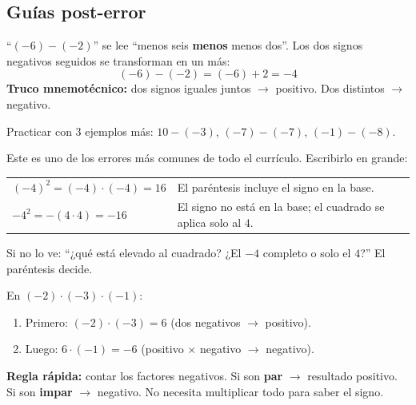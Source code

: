 \documentclass[11pt,a4paper]{article}
\begin{document}
\subsection{Guías post-error}

\begin{tcolorbox}[guia-tutor, title={\color{tutormorado} RESTAR UN NEGATIVO}]
``$(-6) - (-2)$'' se lee ``menos seis \textbf{menos} menos dos''. Los dos signos negativos seguidos se transforman en un más:
\[
  (-6) - (-2) = (-6) + 2 = -4
\]
\textbf{Truco mnemotécnico:} dos signos iguales juntos $\to$ positivo. Dos distintos $\to$ negativo.

Practicar con 3 ejemplos más: $10 - (-3)$, $(-7) - (-7)$, $(-1) - (-8)$.
\end{tcolorbox}

\begin{tcolorbox}[guia-tutor, title={\color{tutormorado} DIFERENCIA ENTRE $(-4)^{2}$ y $-4^{2}$}]
Este es uno de los errores más comunes de todo el currículo. Escribirlo en grande:

\begin{center}
\renewcommand{\arraystretch}{1.5}
\begin{tabular}{@{}ll@{}}
$(-4)^{2} = (-4)\cdot(-4) = 16$ & El paréntesis incluye el signo en la base. \\
$-4^{2} = -(4 \cdot 4) = -16$ & El signo no está en la base; el cuadrado se aplica solo al $4$. \\
\end{tabular}
\end{center}

Si no lo ve: ``¿qué está elevado al cuadrado? ¿El $-4$ completo o solo el $4$?'' El paréntesis decide.
\end{tcolorbox}

\begin{tcolorbox}[guia-tutor, title={\color{tutormorado} PRODUCTO CON CANTIDAD IMPAR DE NEGATIVOS}]
En $(-2) \cdot (-3) \cdot (-1)$:
\begin{enumerate}[nosep]
  \item Primero: $(-2) \cdot (-3) = 6$ (dos negativos $\to$ positivo).
  \item Luego: $6 \cdot (-1) = -6$ (positivo $\times$ negativo $\to$ negativo).
\end{enumerate}

\textbf{Regla rápida:} contar los factores negativos. Si son \textbf{par} $\to$ resultado positivo. Si son \textbf{impar} $\to$ negativo. No necesita multiplicar todo para saber el signo.
\end{tcolorbox}
\end{document}
